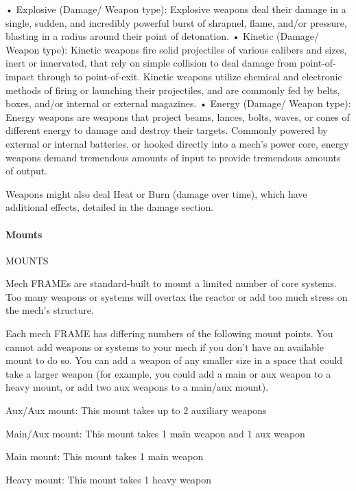 •  Explosive (Damage/ Weapon type): Explosive weapons deal their damage in a single,  
  sudden, and incredibly powerful burst of shrapnel, flame, and/or pressure, blasting in a radius  
  around their point of detonation.   
•  Kinetic (Damage/ Weapon type): Kinetic weapons fire solid projectiles of various calibers and  
  sizes, inert or innervated, that rely on simple collision to deal damage from point-of-impact  
  through to point-of-exit. Kinetic weapons utilize chemical and electronic methods of firing or  
  launching their projectiles, and are commonly fed by belts, boxes, and/or internal or external  
  magazines.   
•  Energy (Damage/ Weapon type): Energy weapons are weapons that project beams, lances,  
  bolts, waves, or cones of different energy to damage and destroy their targets. Commonly  
  powered by external or internal batteries, or hooked directly into a mech’s power core, energy  
  weapons demand tremendous amounts of input to provide tremendous amounts of output. 
 

Weapons might also deal Heat or Burn (damage over time), which have additional effects,  
detailed in the damage section.  
\paragraph{Mounts}
                                                 MOUNTS  

Mech FRAMEs are standard-built to mount a limited number of core systems. Too many  
weapons or systems will overtax the reactor or add too much stress on the mech’s structure.
 

Each mech FRAME has differing numbers of the following mount points. You cannot add  
weapons or systems to your mech if you don’t have an available mount to do so. You can add a  
weapon of any smaller size in a space that could take a larger weapon (for example, you could  
add a main or aux weapon to a heavy mount, or add two aux weapons to a main/aux mount).
 

Aux/Aux mount: This mount takes up to 2 auxiliary weapons
 
Main/Aux mount: This mount takes 1 main weapon and 1 aux weapon
 
Main mount: This mount takes 1 main weapon
 
Heavy mount:  This mount takes 1 heavy weapon
 

                                                                                                              


